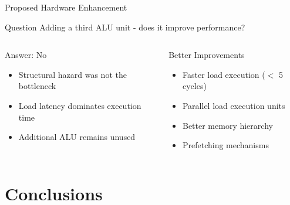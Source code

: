 \documentclass[aspectratio=169,12pt]{beamer}
\begin{document}
\begin{frame}{Proposed Hardware Enhancement}
\begin{block}{Question}
Adding a third ALU unit - does it improve performance?
\end{block}

\vspace{0.5cm}

\begin{columns}[t]
\begin{block}{Answer: No}
\begin{itemize}
    \item Structural hazard was not the bottleneck
    \item Load latency dominates execution time
    \item Additional ALU remains unused
\end{itemize}
\end{block}

\begin{block}{Better Improvements}
\begin{itemize}
    \item Faster load execution ($<$ 5 cycles)
    \item Parallel load execution units
    \item Better memory hierarchy
    \item Prefetching mechanisms
\end{itemize}
\end{block}
\end{columns}
\end{frame}

\section{Conclusions}
\end{document}
